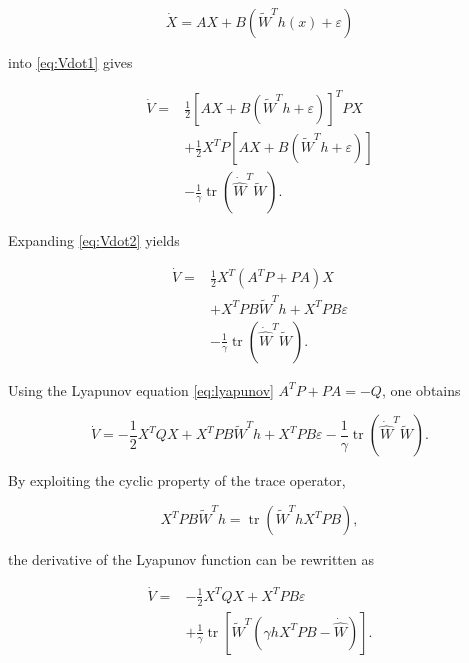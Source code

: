 \begin{equation}
	\dot X
	=
	AX
	+
	B
	\left(
	\tilde W^{T}h(x)
	+
	\varepsilon
	\right)
\end{equation}

into \eqref{eq:Vdot1} gives

\begin{align}
	\dot V
	=&
	\frac12
	\left[
	AX
	+
	B
	\left(
	\tilde W^{T}h
	+
	\varepsilon
	\right)
	\right]^{T}
	PX
	\nonumber\\
	&
	+
	\frac12
	X^{T}
	P
	\left[
	AX
	+
	B
	\left(
	\tilde W^{T}h
	+
	\varepsilon
	\right)
	\right]
	\nonumber\\
	&
	-
	\frac1\gamma
	\operatorname{tr}
	\left(
	\dot{\hat W}^{T}\tilde W
	\right).
	\label{eq:Vdot2}
\end{align}

Expanding \eqref{eq:Vdot2} yields

\begin{align}
	\dot V
	=&
	\frac12
	X^{T}
	(A^{T}P+PA)
	X
	\nonumber\\
	&
	+
	X^{T}PB
	\tilde W^{T}h
	+
	X^{T}PB\varepsilon
	\nonumber\\
	&
	-
	\frac1\gamma
	\operatorname{tr}
	\left(
	\dot{\hat W}^{T}\tilde W
	\right).
	\label{eq:Vdot3}
\end{align}

Using the Lyapunov equation \eqref{eq:lyapunov} $A^{T}P+PA=-Q$, one obtains

\begin{equation}
	\dot V
	=
	-
	\frac12
	X^{T}QX
	+
	X^{T}PB
	\tilde W^{T}h
	+
	X^{T}PB\varepsilon
	-
	\frac1\gamma
	\operatorname{tr}
	\left(
	\dot{\hat W}^{T}\tilde W
	\right).
	\label{eq:Vdot4}
\end{equation}

By exploiting the cyclic property of the trace operator,

\begin{equation}
	X^{T}PB\tilde W^{T}h
	=
	\operatorname{tr}
	\left(
	\tilde W^{T}
	h
	X^{T}
	PB
	\right),
\end{equation}

the derivative of the Lyapunov function can be rewritten as

\begin{align}
	\dot V
	=&
	-
	\frac12
	X^{T}QX
	+
	X^{T}PB\varepsilon
	\nonumber\\
	&
	+
	\frac1\gamma
	\operatorname{tr}
	\left[
	\tilde W^{T}
	\left(
	\gamma
	h
	X^{T}
	PB
	-
	\dot{\hat W}
	\right)
	\right].
	\label{eq:Vdot5}
\end{align}

